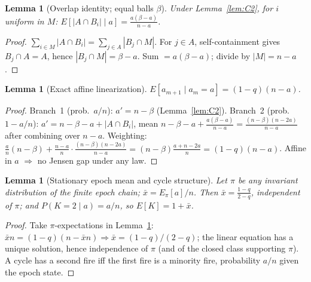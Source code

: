 \documentclass[preprint,12pt]{elsarticle}
\newtheorem{lemma}[theorem]{Lemma}
\begin{document}
\begin{lemma}[Overlap identity; equal balls $\beta$]
\label{lem:C3}
Under Lemma~\ref{lem:C2}, for $i$ uniform in $M$:
$E[|A\cap B_i|\mid a]=\frac{a(\beta-a)}{n-a}$.
\end{lemma}
\begin{proof}
$\sum_{i\in M}|A\cap B_i|=\sum_{j\in A}|B_j\cap M|$. For $j\in A$,
self-containment gives $B_j\cap A=A$, hence $|B_j\cap M|=\beta-a$.
Sum $=a(\beta-a)$; divide by $|M|=n-a$.
\end{proof}

\begin{lemma}[Exact affine linearization]
\label{lem:C4}
$E[a_{m+1}\mid a_m=a]=(1-q)(n-a)$.
\end{lemma}
\begin{proof}
Branch~1 (prob.\ $a/n$): $a'=n-\beta$ (Lemma~\ref{lem:C2}).
Branch~2 (prob.\ $1-a/n$): $a'=n-\beta-a+|A\cap B_i|$, mean
$n-\beta-a+\frac{a(\beta-a)}{n-a}=\frac{(n-\beta)(n-2a)}{n-a}$ after
combining over $n-a$. Weighting:
$\frac{a}{n}(n-\beta)+\frac{n-a}{n}\cdot\frac{(n-\beta)(n-2a)}{n-a}
=(n-\beta)\frac{a+n-2a}{n}=(1-q)(n-a)$. Affine in $a$ $\Rightarrow$ no
Jensen gap under any law.
\end{proof}

\begin{lemma}[Stationary epoch mean and cycle structure]
\label{lem:C5}
Let $\pi$ be any invariant distribution of the finite epoch chain;
$\bar x=E_\pi[a]/n$. Then $\bar x=\frac{1-q}{2-q}$, independent of
$\pi$; and $P(K=2\mid a)=a/n$, so $E[K]=1+\bar x$.
\end{lemma}
\begin{proof}
Take $\pi$-expectations in Lemma~\ref{lem:C4}:
$\bar x n=(1-q)(n-\bar x n)\Rightarrow\bar x=(1-q)/(2-q)$; the linear
equation has a unique solution, hence independence of $\pi$ (and of the
closed class supporting $\pi$). A cycle has a second fire iff the first
fire is a minority fire, probability $a/n$ given the epoch state.
\end{proof}
\end{document}
